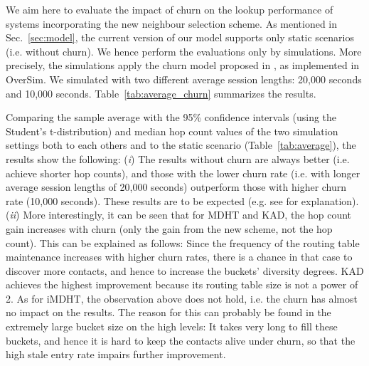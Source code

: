\documentclass[10pt, conference, compsocconf, letterpaper]{IEEEtran}
\begin{document}
We aim here to evaluate the impact of churn on the lookup performance of systems incorporating the new neighbour selection scheme. As mentioned in Sec.~\ref{sec:model}, the current version of our model supports only static scenarios (i.e. without churn). We hence perform the evaluations only by simulations. More precisely, the simulations apply the churn model proposed in \cite{yao2006modeling}, as implemented in OverSim. We simulated with two different average session lengths: 20,000 seconds and 10,000 seconds. Table \,\ref{tab:average_churn} summarizes the results.

Comparing the sample average with the 95\% confidence intervals (using the Student's t-distribution) and median hop count values of the two simulation settings both to each others and to the static scenario (Table \,\ref{tab:average}), the results show the following: (\emph{i}) The results without churn are always better (i.e. achieve shorter hop counts), and those with the lower churn rate (i.e. with longer average session lengths of 20,000 seconds) outperform those with higher churn rate (10,000 seconds). These results are to be expected (e.g. see \cite{stutzbach06understanding, baumgart2012fast} for explanation). (\emph{ii}) More interestingly, it can be seen that for MDHT and KAD, the hop count gain increases with churn (only the gain from the new scheme, not the hop count). This can be explained as follows: Since the frequency of the routing table maintenance increases with higher churn rates, there is a chance in that case to discover more contacts, and hence to increase the buckets' diversity degrees. KAD achieves the highest improvement because its routing table size is not a power of 2. As for iMDHT, the observation above does not hold, i.e. the churn has almost no impact on the results. The reason for this can probably be found in the extremely large bucket size on the high levels: It takes very long to fill these buckets, and hence it is hard to keep the contacts alive under churn, so that the high stale entry rate impairs further improvement.
\end{document}
